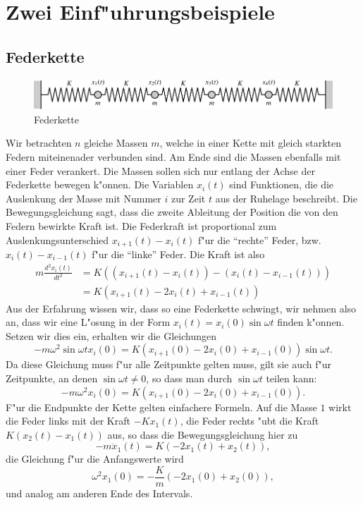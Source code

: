 \section{Zwei Einf"uhrungsbeispiele}
\subsection{Federkette}
\begin{figure}
\begin{center}
\includegraphics[width=\hsize]{images/e-1}
\end{center}
\caption{Federkette}
\end{figure}
Wir betrachten $n$ gleiche Massen $m$, welche in einer Kette mit gleich
starkten Federn miteinenader verbunden sind. Am Ende sind die Massen
ebenfalls mit einer Feder verankert.
Die Massen sollen sich nur entlang der Achse der Federkette bewegen k"onnen.
Die Variablen $x_i(t)$ sind Funktionen, die die Auslenkung der Masse mit
Nummer $i$ zur Zeit $t$ aus der Ruhelage beschreibt. Die Bewegungsgleichung sagt,
dass die zweite Ableitung der Position die von den Federn bewirkte Kraft
ist. Die Federkraft ist proportional zum Auslenkungsunterschied
$x_{i+1}(t)-x_i(t)$ f"ur die ``rechte'' Feder, bzw.~
$x_{i}(t)-x_{i-1}(t)$ f"ur die ``linke'' Feder.
Die Kraft ist also
\begin{align*}
m\frac{d^2x_i(t)}{dt^2}
&=K((x_{i+1}(t)-x_i(t))-(x_i(t)-x_{i-1}(t)))\\
&=K(x_{i+1}(t)-2x_i(t)+x_{i-1}(t))
\end{align*}
Aus der Erfahrung wissen wir, dass so eine Federkette schwingt, wir nehmen also
an, dass wir eine L"osung in der Form $x_i(t)=x_i(0)\sin\omega t$ finden
k"onnen. Setzen wir dies ein, erhalten wir die Gleichungen
$$
-m\omega^2\sin\omega t x_i(0)=K(x_{i+1}(0)-2x_i(0)+x_{i-1}(0))\sin\omega t.
$$
Da diese Gleichung muss f"ur alle Zeitpunkte gelten muss, gilt sie auch f"ur
Zeitpunkte, an denen $\sin\omega t\ne 0$, so dass man durch $\sin\omega t$
teilen kann:
$$
-m\omega^2 x_i(0)=K(x_{i+1}(0)-2x_i(0)+x_{i-1}(0)).
$$
F"ur die Endpunkte der Kette gelten einfachere Formeln. Auf die Masse $1$
wirkt die Feder links mit der Kraft $-Kx_1(t)$, die Feder rechts "ubt die
Kraft $K(x_2(t)-x_1(t))$ aus, so dass die Bewegungsgleichung hier zu
$$
-m\ddot x_1(t)=K(-2x_1(t)+x_2(t)),
$$
die Gleichung f"ur die Anfangswerte wird
$$
\omega^2 x_1(0)=-\frac{K}{m}(-2x_1(0)+x_2(0)),
$$
und analog am anderen Ende des Intervals.

